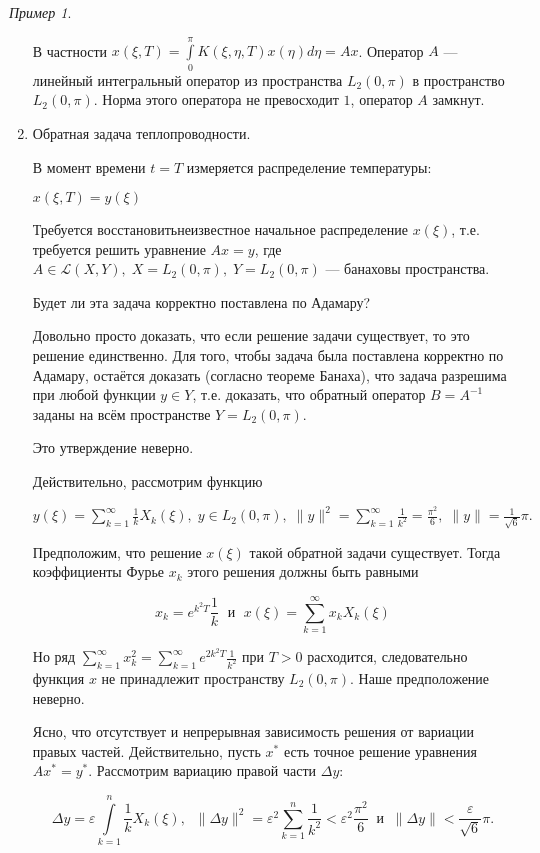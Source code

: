 \documentclass[12pt,a4paper,titlepage,oneside]{book}
\theoremstyle{definition}
\theoremstyle{plain}
\theoremstyle{break}
\theoremstyle{remark}
\theoremstyle{remark}
\newtheorem*{example}{Пример}
\theoremstyle{remark}
\theoremstyle{remark}
\theoremstyle{plain}
\theoremstyle{plain}
\begin{document}
\begin{example}
\begin{enumerate}
В частности $x(\xi,T) = \displaystyle\int\limits_0^\pi K(\xi, \eta, T) x(\eta)d\eta = Ax$. Оператор $A$ --- линейный интегральный оператор из пространства $L_2(0, \pi)$ в пространство $L_2(0, \pi)$. Норма этого оператора не превосходит $1$, оператор $A$ замкнут.

	\item Обратная задача теплопроводности.

В момент времени $t = T$ измеряется  распределение температуры:
\begin{center}
$x(\xi, T) = y(\xi)$
\end{center}

Требуется \guillemotleft восстановить\guillemotright \;неизвестное начальное распределение $x(\xi)$, т.е. требуется решить уравнение $Ax = y$, где $A \in \mathcal{L}(X,Y), \; X = L_{2}(0, \pi), \; Y = L_{2}(0, \pi)$ --- банаховы пространства.

Будет ли эта задача корректно поставлена по Адамару?

Довольно просто доказать, что если решение задачи существует, то это решение единственно. Для того, чтобы задача была поставлена корректно по Адамару, остаётся доказать (согласно теореме Банаха), что задача разрешима при любой функции $y \in Y$, т.е. доказать, что обратный оператор $B = A^{-1}$ заданы на всём пространстве $Y = L_{2}(0, \pi)$.

Это утверждение неверно.

Действительно, рассмотрим функцию
\begin{center}
$y(\xi)=\displaystyle\sum\limits_{k=1}^{\infty} \frac{1}{k} X_k(\xi) ,  \; y\in L_{2}(0, \pi), \; \|y\|^2 = \sum\limits_{k=1}^{\infty} \frac{1}{k^2} = \frac{\pi^2}{6} ,  \; \|y\| = \frac{1}{\sqrt{6}}\pi \mbox{.}$
\end{center}

Предположим, что решение $x(\xi)$ такой обратной задачи существует. Тогда коэффициенты Фурье $x_k$ этого решения должны быть равными

$$x_k=e^{k^2 T} \frac{1}{k} \; \mbox{ и } \; x(\xi) = \displaystyle\sum\limits_{k=1}^{\infty} x_k X_k(\xi)$$

Но ряд $\displaystyle\sum\limits_{k=1}^{\infty} x_k^2 = \sum\limits_{k=1}^{\infty} e^{2k^2 T} \frac{1}{k^2}$ при $T > 0$ расходится, следовательно функция $x$ не принадлежит пространству $L_2(0,\pi)$. Наше предположение неверно.

Ясно, что отсутствует и непрерывная зависимость решения от вариации правых частей. Действительно, пусть $x^{*}$ есть точное решение уравнения $Ax^*=y^*$. Рассмотрим вариацию правой части  $\Delta y$:
\begin{center}
$$\Delta y = \varepsilon \int\limits_{k=1}^{n} \frac{1}{k} X_k(\xi) , \; \; \| \Delta y\|^2 = \varepsilon ^2 \sum\limits_{k=1}^{n} \frac{1}{k^2} < \varepsilon^2 \frac{\pi ^2}{6} \; \; \mbox{и} \; \; \| \Delta y \| < \frac{\varepsilon}{\sqrt{6}}\pi.$$
\end{center}


\end{enumerate}
\end{example}
\end{document}
